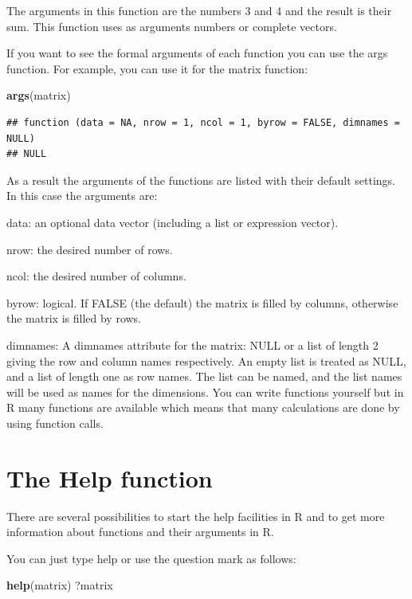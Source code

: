 \documentclass[
]{book}
\newenvironment{Shaded}{\begin{snugshade}}{\end{snugshade}}
\newcommand{\KeywordTok}[1]{\textcolor[rgb]{0.13,0.29,0.53}{\textbf{#1}}}
\newcommand{\NormalTok}[1]{#1}
\begin{document}
The arguments in this function are the numbers 3 and 4 and the result is
their sum. This function uses as arguments numbers or complete vectors.

If you want to see the formal arguments of each function you can use the
args function. For example, you can use it for the matrix function:

\begin{Shaded}
\begin{Highlighting}[]
\KeywordTok{args}\NormalTok{(matrix)}
\end{Highlighting}
\end{Shaded}

\begin{verbatim}
## function (data = NA, nrow = 1, ncol = 1, byrow = FALSE, dimnames = NULL) 
## NULL
\end{verbatim}

As a result the arguments of the functions are listed with their default
settings. In this case the arguments are:

data: an optional data vector (including a list or expression vector).

nrow: the desired number of rows.

ncol: the desired number of columns.

byrow: logical. If FALSE (the default) the matrix is filled by columns,
otherwise the matrix is filled by rows.

dimnames: A dimnames attribute for the matrix: NULL or a list of length
2 giving the row and column names respectively. An empty list is treated
as NULL, and a list of length one as row names. The list can be named,
and the list names will be used as names for the dimensions. You can
write functions yourself but in R many functions are available which
means that many calculations are done by using function calls.

\hypertarget{the-help-function}{%
\section{The Help function}\label{the-help-function}}

There are several possibilities to start the help facilities in R and to
get more information about functions and their arguments in R.

You can just type help or use the question mark as follows:

\begin{Shaded}
\begin{Highlighting}[]
\KeywordTok{help}\NormalTok{(matrix)}
\NormalTok{?matrix}
\end{Highlighting}
\end{Shaded}
\end{document}
